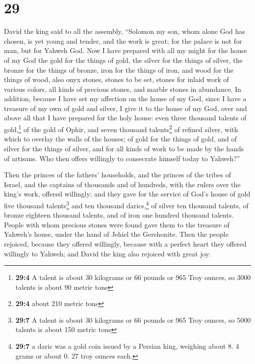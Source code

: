 \hypertarget{section-28}{%
\section{29}\label{section-28}}

 David the king said to all the assembly, ``Solomon my
son, whom alone God has chosen, is yet young and tender, and the work is
great; for the palace is not for man, but for Yahweh God. 
Now I have prepared with all my might for the house of my God the gold
for the things of gold, the silver for the things of silver, the bronze
for the things of bronze, iron for the things of iron, and wood for the
things of wood, also onyx stones, stones to be set, stones for inlaid
work of various colors, all kinds of precious stones, and marble stones
in abundance.  In addition, because I have set my
affection on the house of my God, since I have a treasure of my own of
gold and silver, I give it to the house of my God, over and above all
that I have prepared for the holy house:  even three
thousand talents of gold,\footnote{\textbf{29:4} A talent is about 30
  kilograms or 66 pounds or 965 Troy ounces, so 3000 talents is about 90
  metric tons} of the gold of Ophir, and seven thousand
talents\footnote{\textbf{29:4} about 210 metric tons} of refined silver,
with which to overlay the walls of the houses;  of gold
for the things of gold, and of silver for the things of silver, and for
all kinds of work to be made by the hands of artisans. Who then offers
willingly to consecrate himself today to Yahweh?''

 Then the princes of the fathers' households, and the
princes of the tribes of Israel, and the captains of thousands and of
hundreds, with the rulers over the king's work, offered willingly;
 and they gave for the service of God's house of gold five
thousand talents\footnote{\textbf{29:7} A talent is about 30 kilograms
  or 66 pounds or 965 Troy ounces, so 5000 talents is about 150 metric
  tons} and ten thousand darics,\footnote{\textbf{29:7} a daric was a
  gold coin issued by a Persian king, weighing about 8. 4 grams or about
  0. 27 troy ounces each.} of silver ten thousand talents, of bronze
eighteen thousand talents, and of iron one hundred thousand talents.
 People with whom precious stones were found gave them to
the treasure of Yahweh's house, under the hand of Jehiel the Gershonite.
 Then the people rejoiced, because they offered willingly,
because with a perfect heart they offered willingly to Yahweh; and David
the king also rejoiced with great joy.

